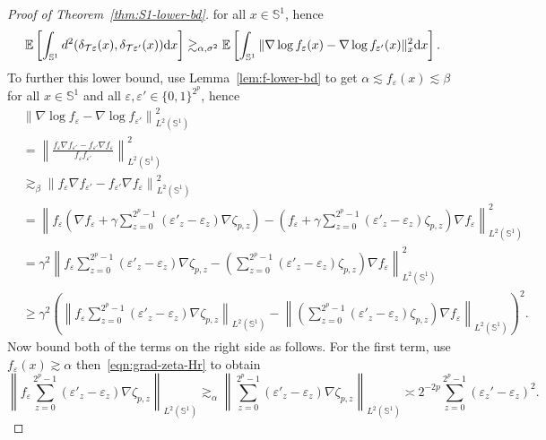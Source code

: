 \documentclass[preprint]{imsart}
\theoremstyle{plain}
\theoremstyle{definition}
\newcommand{\Ebb}{\mathbb{E}}
\newcommand{\diff}{\textnormal{d}}
\newcommand{\T}{\mathcal{T}}
\begin{document}
\begin{appendix}
\begin{proof}[Proof of Theorem~\ref{thm:S1-lower-bd}]
    for all $x\in\mathbb{S}^1$, hence
    \begin{equation*}
        \Ebb\left[\int_{\mathbb{S}^1}d^2(\delta_{\T\varepsilon}(x),\delta_{\T\varepsilon'}(x))\diff x\right] \gtrsim_{\alpha,\sigma^2} \Ebb\left[\int_{\mathbb{S}^1}\|\nabla \log f_{\varepsilon}(x)-\nabla \log f_{\varepsilon'}(x)\|^2_x\diff x\right].
    \end{equation*}
    To further this lower bound, use Lemma~\ref{lem:f-lower-bd} to get $\alpha \lesssim f_{\varepsilon}(x)\lesssim\beta$ for all $x\in\mathbb{S}^1$ and all $\varepsilon,\varepsilon'\in\{0,1\}^{2^p}$, hence
    \begin{align*}
        &\left\|\nabla \log f_{\varepsilon}-\nabla \log f_{\varepsilon'}\right\|_{L^2(\mathbb{S}^1)}^2 \\
        &= \left\|\frac{f_{\varepsilon}\nabla f_{\varepsilon'}-f_{\varepsilon'}\nabla f_{\varepsilon}}{f_{\varepsilon}f_{\varepsilon'}}\right\|_{L^2(\mathbb{S}^1)}^2 \\
        &\gtrsim_{\beta}\left\|f_{\varepsilon}\nabla f_{\varepsilon'}-f_{\varepsilon'}\nabla f_{\varepsilon}\right\|_{L^2(\mathbb{S}^1)}^2 \\
        &= \left\|f_{\varepsilon}\left(\nabla f_{\varepsilon}+\gamma\sum_{z=0}^{2^p-1}(\varepsilon'_z-\varepsilon_z)\nabla \zeta_{p,z}\right)-\left(f_{\varepsilon}+\gamma\sum_{z=0}^{2^p-1}(\varepsilon'_z-\varepsilon_z)\zeta_{p,z}\right)\nabla f_{\varepsilon}\right\|_{L^2(\mathbb{S}^1)}^2 \\
        &= \gamma^2\left\|f_{\varepsilon}\sum_{z=0}^{2^p-1}(\varepsilon'_z-\varepsilon_z)\nabla\zeta_{p,z} -\left(\sum_{z=0}^{2^p-1}(\varepsilon'_z-\varepsilon_z)\zeta_{p,z}\right)\nabla f_{\varepsilon}\right\|_{L^2(\mathbb{S}^1)}^2 \\
        &\ge \gamma^2\left(\left\|f_{\varepsilon}\sum_{z=0}^{2^p-1}(\varepsilon'_z-\varepsilon_z)\nabla\zeta_{p,z}\right\|_{L^2(\mathbb{S}^1)} -\left\|\left(\sum_{z=0}^{2^p-1}(\varepsilon'_z-\varepsilon_z)\zeta_{p,z}\right)\nabla f_{\varepsilon}\right\|_{L^2(\mathbb{S}^1)}\right)^2.
    \end{align*}
    Now bound both of the terms on the right side as follows.
    For the first term, use $f_{\varepsilon}(x)\gtrsim \alpha$ then~\eqref{eqn:grad-zeta-Hr} to obtain
    \begin{equation*}
     \left\|f_{\varepsilon}\sum_{z=0}^{2^p-1}(\varepsilon'_z-\varepsilon_z)\nabla\zeta_{p,z}\right\|_{L^2(\mathbb{S}^1)}\gtrsim_{\alpha} \left\|\sum_{z=0}^{2^p-1}(\varepsilon'_z-\varepsilon_z)\nabla\zeta_{p,z}\right\|_{L^2(\mathbb{S}^1)}\asymp 2^{-2p}\sum_{z=0}^{2^p-1}(\varepsilon_z'-\varepsilon_z)^2.

\end{equation*}
\end{proof}
\end{appendix}
\end{document}
